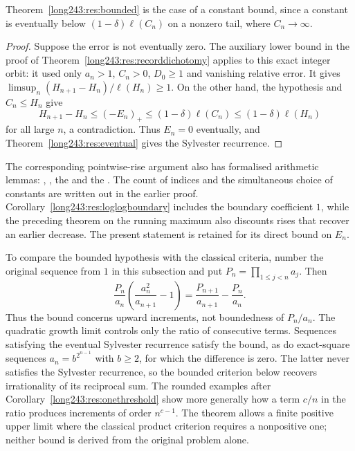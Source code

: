 \documentclass[11pt]{article}
\begin{document}
\noindent Theorem~\ref{long243:res:bounded} is the case of a constant bound, since a
constant is eventually below $(1-\delta)\ell(C_n)$ on a nonzero tail,
where $C_n\to\infty$.

\begin{proof}
Suppose the error is not eventually zero. The auxiliary lower bound in
the proof of Theorem~\ref{long243:res:recorddichotomy} applies to this
exact integer orbit: it used only $a_n>1$, $C_n>0$, $D_0\ge1$ and
vanishing relative error. It gives
$\limsup_n(H_{n+1}-H_n)/\ell(H_n)\ge1$.
On the other hand, the hypothesis and $C_n\le H_n$ give
\[
 H_{n+1}-H_n\le(-E_n)_+
 \le(1-\delta)\ell(C_n)\le(1-\delta)\ell(H_n)
\]
for all large $n$, a contradiction. Thus $E_n=0$ eventually, and
Theorem~\ref{long243:res:eventual} gives the Sylvester recurrence.
\end{proof}

The corresponding pointwise-rise argument also has formalised arithmetic
lemmas:
,
, the
 and
the
.  The count of indices and the simultaneous choice of constants are
written out in the earlier proof. Corollary~\ref{long243:res:loglogboundary} includes the
boundary coefficient $1$, while the preceding theorem on the running
maximum also discounts rises that recover an earlier decrease. The present
statement is retained for its direct bound on $E_n$.

To compare the bounded hypothesis with the classical criteria, number
the original sequence from $1$ in this subsection and put
$P_n=\prod_{1\le j<n}a_j$. Then
\[
 \frac{P_n}{a_n}\left(\frac{a_n^2}{a_{n+1}}-1\right)
 =\frac{P_{n+1}}{a_{n+1}}-\frac{P_n}{a_n}.
\]
Thus the bound concerns upward increments, not boundedness of $P_n/a_n$.
The quadratic growth limit controls only the ratio of consecutive terms.
Sequences satisfying the eventual Sylvester recurrence satisfy the bound, as do exact-square sequences
$a_n=b^{2^{n-1}}$ with $b\ge2$, for which the difference is zero.
The latter never satisfies the Sylvester recurrence, so the bounded
criterion below recovers irrationality of its reciprocal sum.
The rounded examples after Corollary~\ref{long243:res:onethreshold}
show more generally how a term $c/n$ in the ratio produces increments
of order $n^{c-1}$. The theorem allows a finite positive upper limit
where the classical product criterion requires a nonpositive one;
neither bound is derived from the original problem alone.
\end{document}

